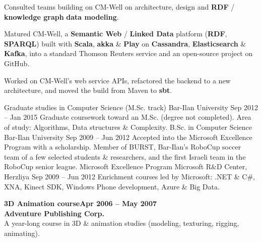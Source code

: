 \documentclass[10pt]{cv}
\newcommand{\kw}[1]{\textbf{#1}}
\begin{document}
\begin{flushleft}

            Consulted teams building on CM-Well on architecture, design and \kw{RDF} / \kw{knowledge graph} \kw{data modeling}.

            Matured CM-Well, a \kw{Semantic Web} / \kw{Linked Data} platform (\kw{RDF}, \kw{SPARQL}) built with \kw{Scala}, \kw{akka} \& \kw{Play} on \kw{Cassandra}, \kw{Elasticsearch} \& \kw{Kafka}, into a standard Thomson Reuters service and an open-source project on GitHub.

            Worked on CM-Well's web service APIs, refactored the backend to a new architecture, and moved the build from Maven to \kw{sbt}.
    \end{flushleft}

    \Experience
        {\ColorHighlight}
        {Graduate studies in Computer Science (M.Sc. track)}
        {Bar-Ilan University}
        {Sep 2012 -- Jan 2015}
        {
            Graduate coursework toward an M.Sc. (degree not completed). Area of study: Algorithms, Data structures \& Complexity.
        }
    \Experience
        {\ColorHighlight}
        {B.Sc. in Computer Science}
        {Bar-Ilan University}
        {Sep 2009 -- Jun 2012}
        {
            Accepted into the Microsoft Excellence Program with a scholarship. Member of BURST, Bar-Ilan's RoboCup soccer team of a few selected students \& researchers, and the first Israeli team in the RoboCup senior league.
        }
    \Experience
        {\ColorHighlight}
        {Microsoft Excellence Program}
        {Microsoft R\&D Center, Herzliya}
        {Sep 2009 -- Jun 2012}
        {
            Enrichment courses led by Microsoft: .NET \& C\#, XNA, Kinect SDK, Windows Phone development, Azure \& Big Data.
        }


    \begin{flushleft}
        \normalsize{\color{MidGrey}\textbf{3D Animation course\hfill{\small\color{\ColorHighlight}Apr 2006 -- May 2007}}}\\\vspace{-.4ex}
        \ssmall{\color{\ColorHighlight}\hrulefill}
        \small{\color{MidGrey}\textbf{Adventure Publishing Corp.}}\\
        \small{\color{MidGrey}A year-long course in 3D \& animation studies (modeling, texturing, rigging, animating).} \\
    \end{flushleft}
\end{document}
